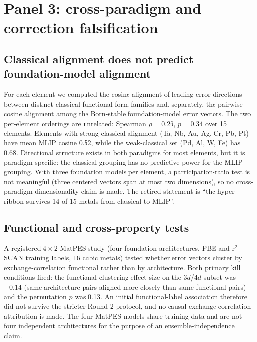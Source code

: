 \documentclass[11pt]{article}
\begin{document}
\section{Panel 3: cross-paradigm and correction falsification}
\label{sec:falsification}

\subsection{Classical alignment does not predict foundation-model alignment}

For each element we computed the cosine alignment of leading error directions between distinct classical functional-form families and, separately, the pairwise cosine alignment among the Born-stable foundation-model error vectors. The two per-element orderings are unrelated: Spearman $\rho=0.26$, $p=0.34$ over 15 elements. Elements with strong classical alignment (Ta, Nb, Au, Ag, Cr, Pb, Pt) have mean MLIP cosine 0.52, while the weak-classical set (Pd, Al, W, Fe) has 0.68. Directional structure exists in both paradigms for most elements, but it is paradigm-specific: the classical grouping has no predictive power for the MLIP grouping. With three foundation models per element, a participation-ratio test is not meaningful (three centered vectors span at most two dimensions), so no cross-paradigm dimensionality claim is made. The retired statement is ``the hyper-ribbon survives 14 of 15 metals from classical to MLIP''.

\subsection{Functional and cross-property tests}

A registered $4\times2$ MatPES study (four foundation architectures, PBE and r$^2$SCAN training labels, 16 cubic metals) tested whether error vectors cluster by exchange-correlation functional rather than by architecture. Both primary kill conditions fired: the functional-clustering effect size on the 3$d$/4$d$ subset was $-0.14$ (same-architecture pairs aligned more closely than same-functional pairs) and the permutation $p$ was 0.13. An initial functional-label association therefore did not survive the stricter Round-2 protocol, and no causal exchange-correlation attribution is made. The four MatPES models share training data and are not four independent architectures for the purpose of an ensemble-independence claim.
\end{document}
